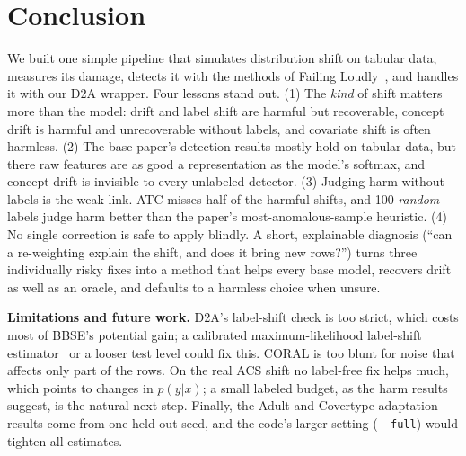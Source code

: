 \documentclass[conference]{IEEEtran}
\newcommand{\Dtwo}{\textsc{D2A}}
\begin{document}
\section{Conclusion}
We built one simple pipeline that simulates distribution shift on tabular data, measures its damage, detects it with the methods of Failing Loudly~\cite{rabanser2019failing}, and handles it with our \Dtwo{} wrapper. Four lessons stand out.
(1) The \emph{kind} of shift matters more than the model: drift and label shift are harmful but recoverable, concept drift is harmful and unrecoverable without labels, and covariate shift is often harmless.
(2) The base paper's detection results mostly hold on tabular data, but there raw features are as good a representation as the model's softmax, and concept drift is invisible to every unlabeled detector.
(3) Judging harm without labels is the weak link. ATC misses half of the harmful shifts, and 100 \emph{random} labels judge harm better than the paper's most-anomalous-sample heuristic.
(4) No single correction is safe to apply blindly. A short, explainable diagnosis (``can a re-weighting explain the shift, and does it bring new rows?'') turns three individually risky fixes into a method that helps every base model, recovers drift as well as an oracle, and defaults to a harmless choice when unsure.

\textbf{Limitations and future work.} \Dtwo{}'s label-shift check is too strict, which costs most of BBSE's potential gain; a calibrated maximum-likelihood label-shift estimator~\cite{alexandari2020mlls} or a looser test level could fix this. CORAL is too blunt for noise that affects only part of the rows. On the real ACS shift no label-free fix helps much, which points to changes in $p(y|x)$; a small labeled budget, as the harm results suggest, is the natural next step. Finally, the Adult and Covertype adaptation results come from one held-out seed, and the code's larger setting (\texttt{-{}-full}) would tighten all estimates.




\end{document}
